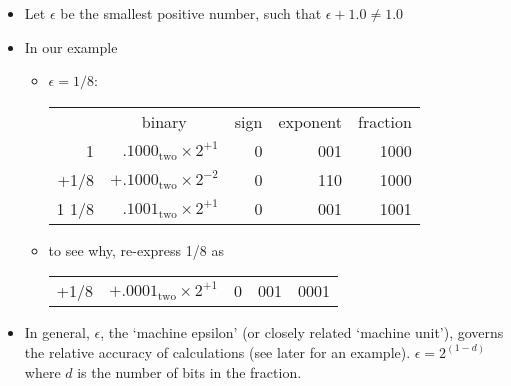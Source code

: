 \documentclass[11pt,a4paper]{article}
\newcommand{\bc}{\begin{center}}
\newcommand{\ec}{\end{center}}
\begin{document}
\begin{frame}[fragile]
	\begin{itemize}
    \item Let $\epsilon$ be the smallest positive number, such that $\epsilon + 1.0 \neq 1.0$
    \item In our example
    \begin{itemize}
			\item <2-> $\epsilon = 1/8$:
    \bc
    \begin{tabular}{rrrrr}
        & \multicolumn{1}{c}{binary} &
            \multicolumn{1}{c}{sign} & \multicolumn{1}{c}{exponent} &
            \multicolumn{1}{c}{fraction}\\
        1 & $.1000_{\mbox{two}} \times 2^{+1}$ &
            0 & 001 & 1000\\
        +1/8 & $+.1000_{\mbox{two}} \times 2^{-2}$ &
            0 & 110 & 1000\\
        \hline
        1 1/8 & $.1001_{\mbox{two}} \times 2^{+1}$ &
            0 & 001 & 1001
    \end{tabular}
    \ec
        \item <2-> to see why, re-express 1/8 as
		    \bc
		    \begin{tabular}{rrrrr}
		        +1/8 & $+.0001_{\mbox{two}} \times 2^{+1}$ &
		            0 & 001 & 0001\\
		    \end{tabular}
		    \ec
    \end{itemize}
    \item <3->In general, $\epsilon$, the  `machine epsilon' (or closely related `machine unit'), governs the relative accuracy of calculations (see later for an example).   $\epsilon = 2^{(1-d)}$ where $d$ is the number of bits in the fraction.
	\end{itemize}
\end{frame}
\end{document}
